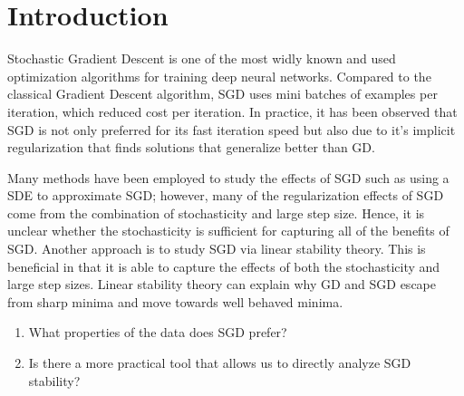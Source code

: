 \section{Introduction}
Stochastic Gradient Descent is one of the most widly known and used optimization algorithms for training deep neural networks. Compared to the classical Gradient Descent algorithm, SGD uses mini batches of examples per iteration, which reduced cost per iteration. In practice, it has been observed that SGD is not only preferred for its fast iteration speed but also due to it's implicit regularization that finds solutions that generalize better than GD.

Many methods have been employed to study the effects of SGD such as using a SDE to approximate SGD; however, many of the regularization effects of SGD come from the combination of stochasticity and large step size. Hence, it is unclear whether the stochasticity is sufficient for capturing all of the benefits of SGD. Another approach is to study SGD via linear stability theory. This is beneficial in that it is able to capture the effects of both the stochasticity and large step sizes. Linear stability theory can explain why GD and SGD escape from sharp minima and move towards well behaved minima. 


\begin{enumerate}
    \item What properties of the data does SGD prefer?
    \item Is there a more practical tool that allows us to directly analyze SGD stability?
\end{enumerate}